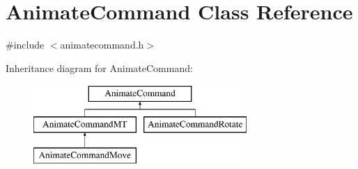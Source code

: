 \hypertarget{a00003}{\section{Animate\-Command Class Reference}
\label{a00003}
}


{\ttfamily \#include $<$animatecommand.\-h$>$}

Inheritance diagram for Animate\-Command\-:\begin{figure}[H]
\begin{center}
\leavevmode
\includegraphics[height=3.000000cm]{a00003}
\end{center}
\end{figure}
